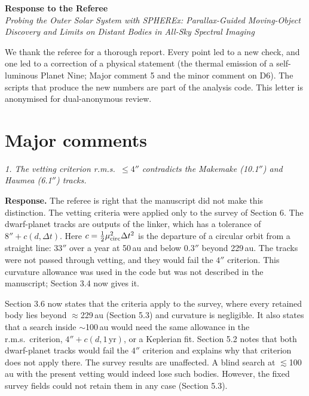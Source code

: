 \documentclass[11pt]{article}
\newenvironment{referee}{\par\color{black!60}\itshape}{\par}
\newcommand{\resp}{\par\noindent\textbf{Response.} }
\begin{document}
\begin{center}
{\large\bfseries Response to the Referee}\\[4pt]
\emph{Probing the Outer Solar System with SPHEREx: Parallax-Guided Moving-Object Discovery and Limits on Distant Bodies in All-Sky Spectral Imaging}
\end{center}

We thank the referee for a thorough report. Every point led to a new check, and one led to a correction of a physical statement (the thermal emission of a self-luminous Planet Nine; Major comment 5 and the minor comment on D6). The scripts that produce the new numbers are part of the analysis code. This letter is anonymised for dual-anonymous review.

\section*{Major comments}

\begin{referee}
1. The vetting criterion r.m.s.\ $\le 4''$ contradicts the Makemake (10.1$''$) and Haumea (6.1$''$) tracks.
\end{referee}
\resp The referee is right that the manuscript did not make this distinction. The vetting criteria were applied only to the survey of Section 6. The dwarf-planet tracks are outputs of the linker, which has a tolerance of $8'' + c(d,\Delta t)$. Here $c = \tfrac12\mu_{\rm circ}^2\Delta t^2$ is the departure of a circular orbit from a straight line: $33''$ over a year at 50\,au and below $0.3''$ beyond 229\,au. The tracks were not passed through vetting, and they would fail the $4''$ criterion. This curvature allowance was used in the code but was not described in the manuscript; Section 3.4 now gives it.

Section 3.6 now states that the criteria apply to the survey, where every retained body lies beyond $\approx$229\,au (Section 5.3) and curvature is negligible. It also states that a search inside $\sim$100\,au would need the same allowance in the r.m.s.\ criterion, $4'' + c(d, 1\,\mathrm{yr})$, or a Keplerian fit. Section 5.2 notes that both dwarf-planet tracks would fail the $4''$ criterion and explains why that criterion does not apply there. The survey results are unaffected. A blind search at $\lesssim$100\,au with the present vetting would indeed lose such bodies. However, the fixed survey fields could not retain them in any case (Section 5.3).
\end{document}
